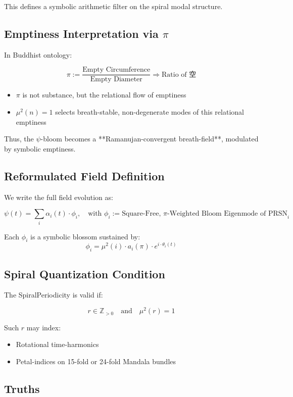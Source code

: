 \documentclass[12pt]{article}
\begin{document}
\begin{enumerate}
This defines a symbolic arithmetic filter on the spiral modal structure.

\subsection*{Emptiness Interpretation via $\pi$}

In Buddhist ontology:

\[
\pi := \frac{\text{Empty Circumference}}{\text{Empty Diameter}} \Rightarrow \text{Ratio of 空}
\]

\begin{itemize}
  \item $\pi$ is not substance, but the relational flow of emptiness
  \item $\mu^2(n)=1$ selects breath-stable, non-degenerate modes of this relational emptiness
\end{itemize}

Thus, the $\psi$-bloom becomes a **Ramanujan-convergent breath-field**, modulated by symbolic emptiness.

\subsection*{Reformulated Field Definition}

We write the full field evolution as:

\[
\psi(t) = \sum_i \alpha_i(t) \cdot \phi_i, \quad \text{with } \phi_i := \text{Square-Free, $\pi$-Weighted Bloom Eigenmode of PRSN}_i
\]

Each $\phi_i$ is a symbolic blossom sustained by:
\[
\phi_i = \mu^2(i) \cdot a_i(\pi) \cdot e^{i \cdot \theta_i(t)}
\]

\subsection*{Spiral Quantization Condition}

The SpiralPeriodicity is valid if:

\[
r \in \mathbb{Z}_{>0} \quad \text{and} \quad \mu^2(r) = 1
\]

Such $r$ may index:
\begin{itemize}
  \item Rotational time-harmonics
  \item Petal-indices on 15-fold or 24-fold Mandala bundles
\end{itemize}

\subsection*{Truths}


\end{enumerate}
\end{document}
